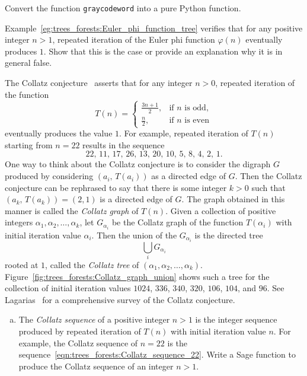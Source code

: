 \begin{problem}
\item Convert the function \texttt{graycodeword} into a pure Python
  function.

\item Example~\ref{eg:trees_forests:Euler_phi_function_tree} verifies
  that for any positive integer $n > 1$, repeated iteration of the
  Euler phi function $\varphi(n)$ eventually
  produces $1$. Show that this is the case or provide an explanation
  why it is in general false.

\item The Collatz
  conjecture~\cite{Lagarias1985} asserts that for any integer $n > 0$,
  repeated iteration of the function
  \[
  T(n)
  =
  \begin{cases}
  \frac{3n + 1}{2}, & \text{if $n$ is odd}, \\
  \frac{n}{2}, & \text{if $n$ is even}
  \end{cases}
  \]
  eventually produces the value $1$. For example, repeated iteration
  of $T(n)$ starting from $n = 22$ results in the sequence
  \begin{equation}
  \label{eqn:trees_forests:Collatz_sequence_22}
  22,\, 11,\, 17,\, 26,\, 13,\, 20,\, 10,\, 5,\, 8,\, 4,\, 2,\, 1.
  \end{equation}
  One way to think about the Collatz
  conjecture is to consider the digraph $G$ produced by considering
  $(a_i,\, T(a_i))$ as a directed edge of $G$. Then the Collatz
  conjecture can be rephrased to say that there is some integer
  $k > 0$ such that $(a_k,\, T(a_k)) = (2, 1)$ is a directed edge of
  $G$. The graph obtained in this manner is called the
  \emph{Collatz graph} of $T(n)$. Given a
  collection of positive integers
  $\alpha_1, \alpha_2, \dots, \alpha_k$, let $G_{\alpha_i}$ be the
  Collatz graph of the function $T(\alpha_i)$ with initial iteration
  value $\alpha_i$. Then the union of the $G_{\alpha_i}$ is the
  directed tree
  \[
  \bigcup_i G_{\alpha_i}
  \]
  rooted at $1$, called the \emph{Collatz tree} of
  $(\alpha_1, \alpha_2, \dots, \alpha_k)$.
  Figure~\ref{fig:trees_forests:Collatz_graph_union} shows such a tree
  for the collection of initial iteration values $1024$, $336$, $340$,
  $320$, $106$, $104$, and $96$. See
  Lagarias~\cite{Lagarias2009a,Lagarias2009b}
  for a comprehensive survey of the Collatz
  conjecture.
  \begin{enumerate}[(a)]
  \item The \emph{Collatz sequence} of a
    positive integer $n > 1$ is the integer sequence produced by
    repeated iteration of $T(n)$ with initial iteration value $n$. For
    example, the Collatz sequence of $n = 22$ is the
    sequence~\eqref{eqn:trees_forests:Collatz_sequence_22}. Write a
    Sage function to produce the Collatz sequence of an integer $n > 1$.


\end{enumerate}
\end{problem}
